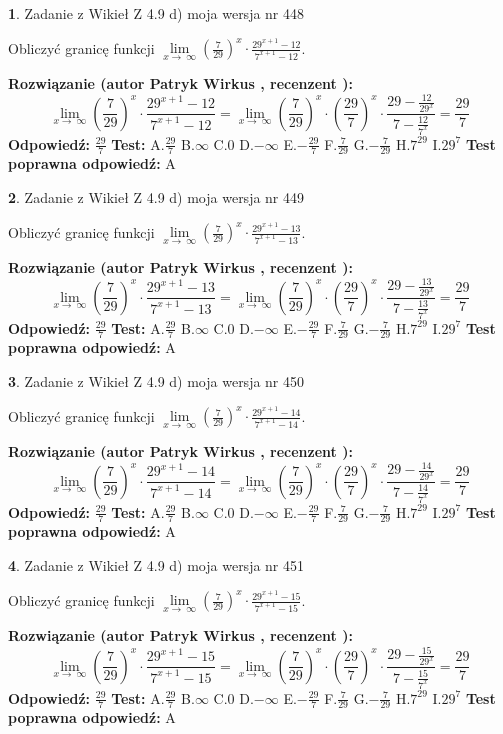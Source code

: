 \documentclass[12pt, a4paper]{article}
\theoremstyle{definition} %
\newtheorem{zad}{}
\newcommand{\zadStart}[1]{\begin{zad}#1\newline}
\newcommand{\zadStop}{\end{zad}}
\newcommand{\rozwStart}[2]{\noindent \textbf{Rozwiązanie (autor #1 , recenzent #2): }\newline}
\newcommand{\rozwStop}{\newline}
\newcommand{\odpStart}{\noindent \textbf{Odpowiedź:}\newline}
\newcommand{\odpStop}{\newline}
\newcommand{\testStart}{\noindent \textbf{Test:}\newline}
\newcommand{\testStop}{\newline}
\newcommand{\kluczStart}{\noindent \textbf{Test poprawna odpowiedź:}\newline}
\newcommand{\kluczStop}{\newline}
\begin{document}
\zadStart{Zadanie z Wikieł Z 4.9 d) moja wersja nr 448}


Obliczyć granicę funkcji  $\lim\limits_{x\to\ \infty}(\frac{7}{29})^{x}\cdot\frac{29^{x+1}-12}{7^{x+1}-12}$.
\zadStop
\rozwStart{Patryk Wirkus}{}
$$\lim\limits_{x\to\ \infty}(\frac{7}{29})^{x}\cdot\frac{29^{x+1}-12}{7^{x+1}-12}=\lim\limits_{x\to\ \infty}(\frac{7}{29})^{x}\cdot(\frac{29}{7})^{x} \cdot \frac{29-\frac{12}{29^{x}}}{7-\frac{12}{7^{x}}} = \frac{29}{7}$$
\rozwStop
\odpStart
$\frac{29}{7}$
\odpStop
\testStart
A.$\frac{29}{7}$ B.$\infty$ C.$0$ D.$-\infty$ E.$-\frac{29}{7}$
F.$\frac{7}{29}$ G.$-\frac{7}{29}$
H.$7^{29}$
I.$29^{7}$
\testStop
\kluczStart
A
\kluczStop



\zadStart{Zadanie z Wikieł Z 4.9 d) moja wersja nr 449}


Obliczyć granicę funkcji  $\lim\limits_{x\to\ \infty}(\frac{7}{29})^{x}\cdot\frac{29^{x+1}-13}{7^{x+1}-13}$.
\zadStop
\rozwStart{Patryk Wirkus}{}
$$\lim\limits_{x\to\ \infty}(\frac{7}{29})^{x}\cdot\frac{29^{x+1}-13}{7^{x+1}-13}=\lim\limits_{x\to\ \infty}(\frac{7}{29})^{x}\cdot(\frac{29}{7})^{x} \cdot \frac{29-\frac{13}{29^{x}}}{7-\frac{13}{7^{x}}} = \frac{29}{7}$$
\rozwStop
\odpStart
$\frac{29}{7}$
\odpStop
\testStart
A.$\frac{29}{7}$ B.$\infty$ C.$0$ D.$-\infty$ E.$-\frac{29}{7}$
F.$\frac{7}{29}$ G.$-\frac{7}{29}$
H.$7^{29}$
I.$29^{7}$
\testStop
\kluczStart
A
\kluczStop



\zadStart{Zadanie z Wikieł Z 4.9 d) moja wersja nr 450}


Obliczyć granicę funkcji  $\lim\limits_{x\to\ \infty}(\frac{7}{29})^{x}\cdot\frac{29^{x+1}-14}{7^{x+1}-14}$.
\zadStop
\rozwStart{Patryk Wirkus}{}
$$\lim\limits_{x\to\ \infty}(\frac{7}{29})^{x}\cdot\frac{29^{x+1}-14}{7^{x+1}-14}=\lim\limits_{x\to\ \infty}(\frac{7}{29})^{x}\cdot(\frac{29}{7})^{x} \cdot \frac{29-\frac{14}{29^{x}}}{7-\frac{14}{7^{x}}} = \frac{29}{7}$$
\rozwStop
\odpStart
$\frac{29}{7}$
\odpStop
\testStart
A.$\frac{29}{7}$ B.$\infty$ C.$0$ D.$-\infty$ E.$-\frac{29}{7}$
F.$\frac{7}{29}$ G.$-\frac{7}{29}$
H.$7^{29}$
I.$29^{7}$
\testStop
\kluczStart
A
\kluczStop



\zadStart{Zadanie z Wikieł Z 4.9 d) moja wersja nr 451}


Obliczyć granicę funkcji  $\lim\limits_{x\to\ \infty}(\frac{7}{29})^{x}\cdot\frac{29^{x+1}-15}{7^{x+1}-15}$.
\zadStop
\rozwStart{Patryk Wirkus}{}
$$\lim\limits_{x\to\ \infty}(\frac{7}{29})^{x}\cdot\frac{29^{x+1}-15}{7^{x+1}-15}=\lim\limits_{x\to\ \infty}(\frac{7}{29})^{x}\cdot(\frac{29}{7})^{x} \cdot \frac{29-\frac{15}{29^{x}}}{7-\frac{15}{7^{x}}} = \frac{29}{7}$$
\rozwStop
\odpStart
$\frac{29}{7}$
\odpStop
\testStart
A.$\frac{29}{7}$ B.$\infty$ C.$0$ D.$-\infty$ E.$-\frac{29}{7}$
F.$\frac{7}{29}$ G.$-\frac{7}{29}$
H.$7^{29}$
I.$29^{7}$
\testStop
\kluczStart
A
\kluczStop
\end{document}
